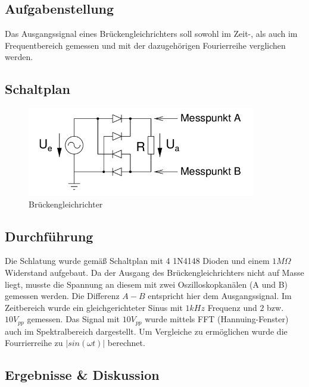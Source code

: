 \documentclass[12pt,a4paper,titlepage]{article}
\begin{document}
\subsection*{Aufgabenstellung}
Das Ausgangssignal eines Brückengleichrichters soll sowohl im Zeit-, als auch im Frequentbereich gemessen und mit der dazugehörigen Fourierreihe verglichen werden.

\subsection*{Schaltplan}
\begin{figure}[H]
  \centering
  \includegraphics[width=100mm]{bg_schaltung.png}
  \caption{Brückengleichrichter}
  \label{figure41}
\end{figure}

\subsection*{Durchf\"uhrung}
Die Schlatung wurde gemäß Schaltplan mit 4 1N4148 Dioden und einem $1M\Omega$ Widerstand aufgebaut. Da der Ausgang des Brückengleichrichters nicht auf Masse liegt, musste die Spannung an diesem mit zwei Oszilloskopkanälen (A und B) gemessen werden. Die Differenz $A - B$ entspricht hier dem Ausgangssignal. Im Zeitbereich wurde ein gleichgerichteter Sinus mit $1kHz$ Frequenz und $2$ bzw. $10V_{pp}$ gemessen. Das Signal mit $10V_{pp}$ wurde mittels FFT (Hannuing-Fenster) auch im Spektralbereich dargestellt. Um Vergleiche zu ermöglichen wurde die Fourrierreihe zu $|sin(\omega t)|$ berechnet.

\subsection*{Ergebnisse \& Diskussion}
\end{document}
